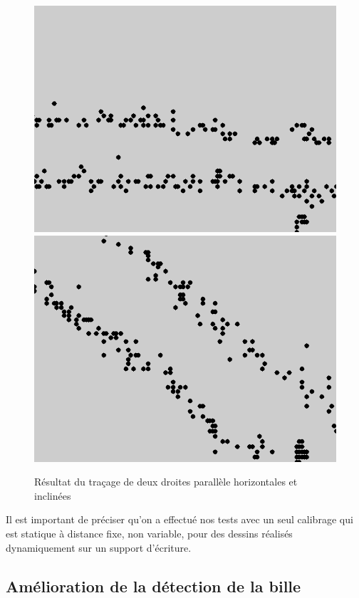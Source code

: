 \documentclass[12pt,a4paper,oneside]{book}
\begin{document}
	\begin{figure}[H]		
		\centering
		\includegraphics[scale=0.45]{images/A44.png}
		\includegraphics[scale=0.45]{images/FormatA41.png}
		\caption{Résultat du traçage de deux droites parallèle horizontales et inclinées}
		\label{figb}
	\end{figure}
	
	Il est important de préciser qu'on a effectué nos tests avec un seul calibrage qui est statique à distance fixe, non variable, pour des dessins réalisés dynamiquement sur un support d'écriture.
	
	
	\subsection{Amélioration de la détection de la bille}
	
\end{document}
